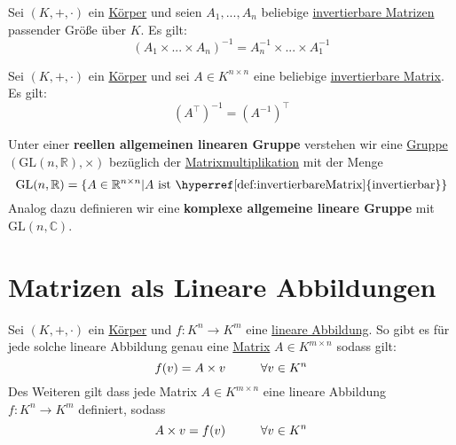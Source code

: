 \documentclass[../../main.tex]{subfiles}
\begin{document}
	\begin{theorem}
		Sei $(K,+,\cdot)$ ein \hyperref[def:Körper]{Körper} und seien $A_1, ..., A_n$ beliebige \hyperref[def:invertierbareMatrix]{invertierbare Matrizen} passender Größe über $K$. Es gilt: $$(A_1 \times ... \times A_n)^{-1} = A_n^{-1} \times ... \times A_1^{-1}$$
	\end{theorem}

	\begin{theorem}
		Sei $(K,+,\cdot)$ ein \hyperref[def:Körper]{Körper} und sei $A \in K^{n \times n}$ eine beliebige \hyperref[def:invertierbareMatrix]{invertierbare Matrix}. Es gilt: $$(A^\top)^{-1} = (A^{-1})^\top$$
	\end{theorem}

	\begin{definition}
		Unter einer \textbf{reellen allgemeinen linearen Gruppe} verstehen wir eine \hyperref[def:Gruppe]{Gruppe} $(\textrm{GL}(n,\mathbb{R}),\times)$ bezüglich der \hyperref[def:Matrixmultiplikation]{Matrixmultiplikation} mit der Menge $$\textrm{GL}(n,\mathbb{R}) = \{A \in \mathbb{R}^{n\times n} | A \textrm{ ist \hyperref[def:invertierbareMatrix]{invertierbar}} \}$$
		Analog dazu definieren wir eine \textbf{komplexe allgemeine lineare Gruppe} mit $\textrm{GL}(n, \mathbb{C})$. 
	\end{definition}

	\newpage
	\section{Matrizen als Lineare Abbildungen}
	

	\begin{theorem}
		\label{theorem:MatrizenAlsLineareAbbildungen}
		Sei $(K,+,\cdot)$ ein \hyperref[def:Körper]{Körper} und $f: K^n \rightarrow K^m$ eine \hyperref[def:LineareAbbildung]{lineare Abbildung}. So gibt es für jede solche lineare Abbildung genau eine \hyperref[def:Matrix]{Matrix} $A \in K^{m \times n}$ sodass gilt: 
		$$
		f(v) = A \times v \hspace*{1cm} \forall v \in K^n
		$$
		Des Weiteren gilt dass jede Matrix $A \in K^{m \times n}$ eine lineare Abbildung $f: K^n \rightarrow K^m$ definiert, sodass 
		$$
		A \times v = f(v) \hspace*{1cm} \forall v \in K^n
		$$
	\end{theorem}
\end{document}
